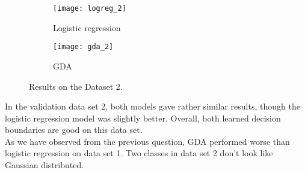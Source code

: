 
\begin{answer}
	
	\begin{figure}[H]
		\centering
		\begin{subfigure}[H]{0.45\linewidth}
			\texttt{[image: logreg\_2]}
			\caption{Logistic regression}
		\end{subfigure}
		\begin{subfigure}[H]{0.45\linewidth}
			\texttt{[image: gda\_2]}
			\caption{GDA}
		\end{subfigure}
		\caption{Results on the Dataset 2.}
	\end{figure}
	In the validation data set 2, both models gave rather similar results, though the logistic regression model was slightly better. Overall, both learned decision boundaries are good on this data set. \\
	As we have observed from the previous question, GDA performed worse than logistic regression on data set 1. Two classes in data set 2 don't look like Gaussian distributed.
	
\end{answer}


